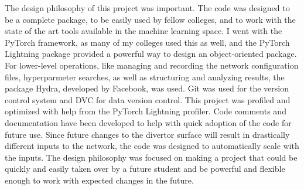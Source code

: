 \label{sec:code:philosophy}
The design philosophy of this project was important. The code was designed to be a complete package, to be easily used by fellow colleges, and to work with the state of the art tools available in the machine learning space.
I went with the PyTorch framework, as many of my colleges used this as well, and the PyTorch Lightning package provided a powerful way to design an object-oriented package.
For lower-level operations, like managing and recording the network configuration files, hyperparmeter searches, as well as structuring and analyzing results, the package Hydra, developed by Facebook, was used.
Git was used for the version control system and DVC for data version control.
This project was profiled and optimized with help from the PyTorch Lightning profiler.
Code comments and documentation have been developed to help with quick adoption of the code for future use.
Since future changes to the divertor surface will result in drastically different inputs to the network, the code was designed to automatically scale with the inputs.
The design philosophy was focused on making a project that could be quickly and easily taken over by a future student and be powerful and flexible enough to work with expected changes in the future.














